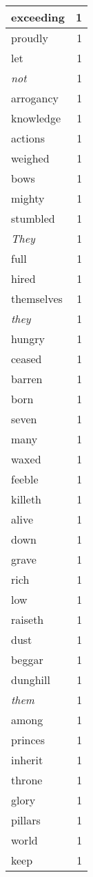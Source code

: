 \begin{center}
\begin{longtable}{l|r}
exceeding & 1 \\ \hline
proudly & 1 \\ \hline
let & 1 \\ \hline
\emph{not} & 1 \\ \hline
arrogancy & 1 \\ \hline
knowledge & 1 \\ \hline
actions & 1 \\ \hline
weighed & 1 \\ \hline
bows & 1 \\ \hline
mighty & 1 \\ \hline
stumbled & 1 \\ \hline
\emph{They} & 1 \\ \hline
full & 1 \\ \hline
hired & 1 \\ \hline
themselves & 1 \\ \hline
\emph{they} & 1 \\ \hline
hungry & 1 \\ \hline
ceased & 1 \\ \hline
barren & 1 \\ \hline
born & 1 \\ \hline
seven & 1 \\ \hline
many & 1 \\ \hline
waxed & 1 \\ \hline
feeble & 1 \\ \hline
killeth & 1 \\ \hline
alive & 1 \\ \hline
down & 1 \\ \hline
grave & 1 \\ \hline
rich & 1 \\ \hline
low & 1 \\ \hline
raiseth & 1 \\ \hline
dust & 1 \\ \hline
beggar & 1 \\ \hline
dunghill & 1 \\ \hline
\emph{them} & 1 \\ \hline
among & 1 \\ \hline
princes & 1 \\ \hline
inherit & 1 \\ \hline
throne & 1 \\ \hline
glory & 1 \\ \hline
pillars & 1 \\ \hline
world & 1 \\ \hline
keep & 1 \\ \hline

\end{longtable}
\end{center}
